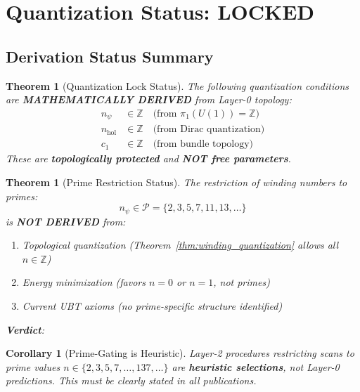 \documentclass[12pt]{article}
\newtheorem{theorem}[definition]{Theorem}
\newtheorem{corollary}[definition]{Corollary}
\newcommand{\Z}{\mathbb{Z}}
\begin{document}
\section{Quantization Status: LOCKED}

\subsection{Derivation Status Summary}

\begin{theorem}[Quantization Lock Status]
The following quantization conditions are \textbf{MATHEMATICALLY DERIVED} from Layer-0 topology:
\begin{align}
n_\psi &\in \Z \quad \text{(from } \pi_1(U(1)) = \Z \text{)} \label{eq:derived_winding} \\
n_{\text{hol}} &\in \Z \quad \text{(from Dirac quantization)} \label{eq:derived_holonomy} \\
c_1 &\in \Z \quad \text{(from bundle topology)} \label{eq:derived_chern}
\end{align}
These are \textbf{topologically protected} and \textbf{NOT free parameters}.
\end{theorem}

\begin{theorem}[Prime Restriction Status]
\label{thm:prime_structure_not_derived}
The restriction of winding numbers to primes:
\begin{equation}
n_\psi \in \mathcal{P} = \{2, 3, 5, 7, 11, 13, \ldots\}
\end{equation}
is \textbf{NOT DERIVED} from:
\begin{enumerate}
    \item Topological quantization (Theorem~\ref{thm:winding_quantization} allows all $n \in \Z$)
    \item Energy minimization (favors $n=0$ or $n=1$, not primes)
    \item Current UBT axioms (no prime-specific structure identified)
\end{enumerate}
\textbf{Verdict}: 
\end{theorem}

\begin{corollary}[Prime-Gating is Heuristic]
Layer-2 procedures restricting scans to prime values $n \in \{2, 3, 5, 7, \ldots, 137, \ldots\}$ are \textbf{heuristic selections}, not Layer-0 predictions. This must be clearly stated in all publications.
\end{corollary}
\end{document}
